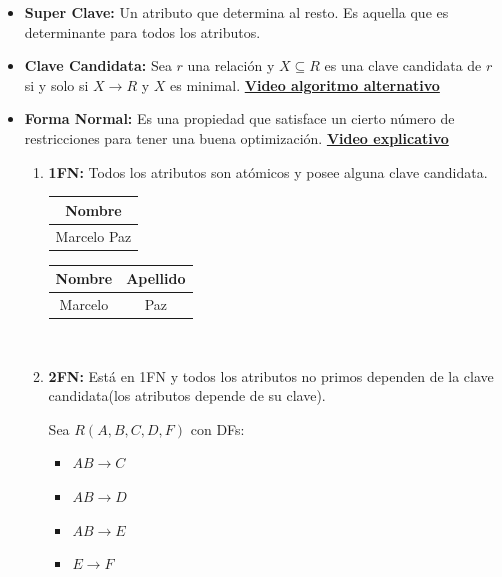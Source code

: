 \documentclass{templateNote}
\begin{document}
\begin{itemize}
    \newpage
    \item \textbf{Super Clave:} Un atributo que determina al resto. Es aquella que es determinante para todos los atributos.

    \item \textbf{Clave Candidata:} Sea $r$ una relación y $X \subseteq R$ es una clave candidata de $r$ si y solo si $X \rightarrow R$ y $X$ es minimal.
    \textbf{\href{https://www.youtube.com/watch?v=MRD35wGmsUg}{Video algoritmo alternativo}}

    \item \textbf{Forma Normal:} Es una propiedad que satisface un cierto número de restricciones para tener una buena optimización.
    \textbf{\href{https://www.youtube.com/playlist?list=PLE19WVM4rff1ion43QTNdbbejTKNhYs8x}{Video explicativo}}
    
    \begin{enumerate}
        \item \textbf{1FN:} Todos los atributos son atómicos y posee alguna clave candidata.
        \\

        \begin{minipage}{0.5\textwidth}
            \begin{tabular}{|c|}
                \hline
                \textbf{Nombre}\\ \hline
                \rowcolor{red!20!white} Marcelo Paz \\ \hline
            \end{tabular}
        \end{minipage}
        \hfill
        \begin{minipage}{0.5\textwidth}
            \begin{tabular}{|c|c|}
                \hline
                \textbf{Nombre} & \textbf{Apellido}\\ \hline
                \rowcolor{green!20!white} Marcelo & Paz \\ \hline
            \end{tabular}
        \end{minipage}
        \\
        
        \item \textbf{2FN:} Está en 1FN y todos los atributos no primos dependen de la clave candidata(los atributos depende de su clave).
        
        Sea $R(A,B,C,D,F)$ con DFs:
        \begin{itemize}
            \item $AB \rightarrow C$
            \item $AB \rightarrow D$
            \item $AB \rightarrow E$
            \item $E \rightarrow F$
        \end{itemize}


\end{enumerate}
\end{itemize}
\end{document}
